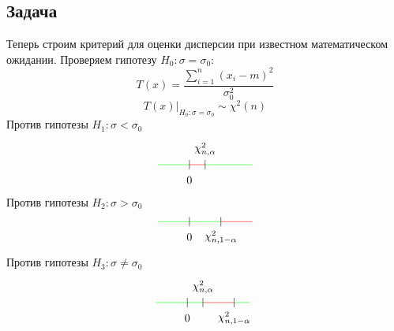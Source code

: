 \documentclass[12pt, a4paper]{article}
\begin{document}
\subsection*{Задача}
Теперь строим критерий для оценки дисперсии при известном математическом ожидании. Проверяем гипотезу $H_0: \sigma = \sigma_0$:
\[T(x) = \frac{\sum_{i = 1}^{n} (x_i - m)^2}{\sigma_0^2}\]
\[T(x) \big|_{H_0: \sigma = \sigma_0} \sim \chi^2(n)\]
Против гипотезы $H_1: \sigma < \sigma_0$
\[\begin{tikzpicture}
    \draw[green] (-1, 0) -- (0, 0);
    \draw[red] (0, 0) -- (0.5, 0);
    \draw[green] (0.5, 0) -- (2, 0);
    \draw (0, -0.15) -- ++(0, 0.3);
    \node at (0, -0.5) (a) {$0$};
    \draw (0.5, -0.15) -- ++(0, 0.3);
    \node at (0.5, 0.5) (a) {$\chi^2_{n, \alpha}$};
\end{tikzpicture}\]
Против гипотезы $H_2: \sigma > \sigma_0$
\[\begin{tikzpicture}
    \draw[green] (-1, 0) -- (0, 0);
    \draw[green] (0, 0) -- (1, 0);
    \draw[red] (1, 0) -- (2, 0);
    \draw (0, -0.15) -- ++(0, 0.3);
    \node at (0, -0.5) (a) {$0$};
    \draw (1, -0.15) -- ++(0, 0.3);
    \node at (1, -0.5) (a) {$\chi^2_{n, 1 - \alpha}$};
\end{tikzpicture}\]
Против гипотезы $H_3: \sigma \neq \sigma_0$
\[\begin{tikzpicture}
    \draw[green] (-1, 0) -- (0, 0);
    \draw[green] (0, 0) -- (0.5, 0);
    \draw[green] (1.5, 0) -- ++(0.5, 0);
    \draw[red] (0.5, 0) -- (1.5, 0);
    \draw (0, -0.15) -- ++(0, 0.3);
    \node at (0, -0.5) (a) {$0$};
    \draw (0.5, -0.15) -- ++(0, 0.3);
    \draw (1.5, -0.15) -- ++(0, 0.3);
    \node at (0.5, 0.5) (a) {$\chi^2_{n, \alpha}$};
    \node at (1.5, -0.5) (a) {$\chi^2_{n, 1 - \alpha}$};
\end{tikzpicture}\]
\end{document}
